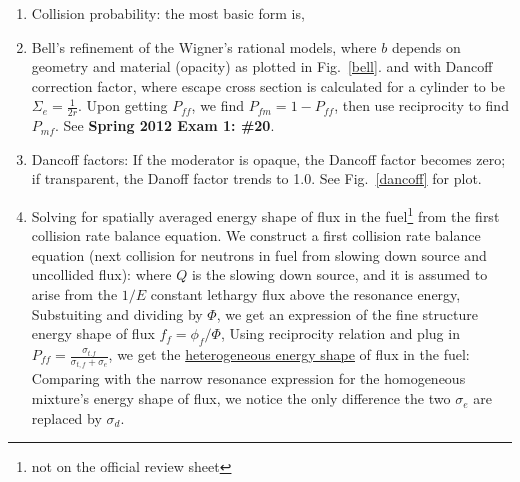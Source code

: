 \documentclass{school-22.211-notes}
\begin{document}
\begin{enumerate}
\begin{enumerate}
    \item Collision probability: the most basic form is, 

    \item Bell's refinement of the Wigner's rational models, where $b$ depends on geometry and material (opacity) as plotted in Fig.~\ref{bell}.
      and with Dancoff correction factor, 
      where escape cross section is calculated for a cylinder to be $\Sigma_e = \frac{1}{2r}$.  Upon getting $P_{ff}$, we find $P_{fm} = 1 - P_{ff}$, then use reciprocity to find $P_{mf}$. See \textbf{Spring 2012 Exam 1: \#20}. 

    \item Dancoff factors: If the moderator is opaque, the Dancoff factor becomes zero; if transparent, the Danoff factor trends to 1.0. See Fig.~\ref{dancoff} for plot. 

    \item Solving for spatially averaged energy shape of flux in the fuel\footnote{not on the official review sheet} from the first collision rate balance equation.  We construct a first collision rate balance equation (next collision for neutrons in fuel from slowing down source and uncollided flux): 
      where $Q$ is the slowing down source, and it is assumed to arise from the $1/E$ constant lethargy flux above the resonance energy, 
      Substuiting and dividing by $\Phi$, we get an expression of the fine structure energy shape of flux $f_f = \phi_f / \Phi$, 
      Using reciprocity relation and plug in $P_{ff} = \frac{\sigma_{t.f}}{\sigma_{t,f} + \sigma_e}$, we get the \uline{heterogeneous energy shape} of flux in the fuel: 
     Comparing with the narrow resonance expression for the homogeneous mixture's energy shape of flux, we notice the only difference the two $\sigma_e$ are replaced by $\sigma_d$. 


\end{enumerate}
\end{enumerate}
\end{document}
